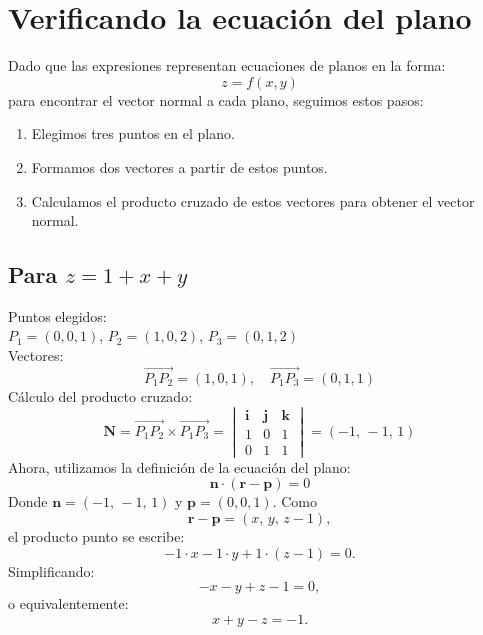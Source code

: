 \documentclass{article}
\begin{document}
\section{Verificando la ecuación del plano}
Dado que las expresiones representan ecuaciones de planos en la forma:
\begin{equation}
    z = f(x, y)
\end{equation}
para encontrar el vector normal a cada plano, seguimos estos pasos:
\begin{enumerate}
    \item Elegimos tres puntos en el plano.
    \item Formamos dos vectores a partir de estos puntos.
    \item Calculamos el producto cruzado de estos vectores para obtener el vector normal.
\end{enumerate}

\subsection{Para $z = 1 + x + y$}
Puntos elegidos: \\ 
$P_1 = (0,0,1)$, $P_2 = (1,0,2)$, $P_3 = (0,1,2)$ \\[1mm]
Vectores:
\begin{equation*}
    \overrightarrow{P_1P_2} = (1,0,1), \quad \overrightarrow{P_1P_3} = (0,1,1)
\end{equation*}
Cálculo del producto cruzado:
\begin{equation*}
    \mathbf{N} = \overrightarrow{P_1P_2} \times \overrightarrow{P_1P_3} =
    \begin{vmatrix} 
    \mathbf{i} & \mathbf{j} & \mathbf{k} \\
    1 & 0 & 1 \\
    0 & 1 & 1
    \end{vmatrix} = (-1,\,-1,\,1)
\end{equation*}
Ahora, utilizamos la definición de la ecuación del plano:
\[
\mathbf{n} \cdot (\mathbf{r} - \mathbf{p}) = 0
\]
Donde \( \mathbf{n} = (-1,\,-1,\,1) \) y \( \mathbf{p} = (0,0,1) \). Como
\[
\mathbf{r} - \mathbf{p} = (x,\,y,\,z-1),
\]
el producto punto se escribe:
\[
-1\cdot x - 1\cdot y + 1\cdot (z-1)=0.
\]
Simplificando:
\[
-x - y + z - 1 = 0,
\]
o equivalentemente:
\[
x + y - z = -1.
\]
\end{document}
